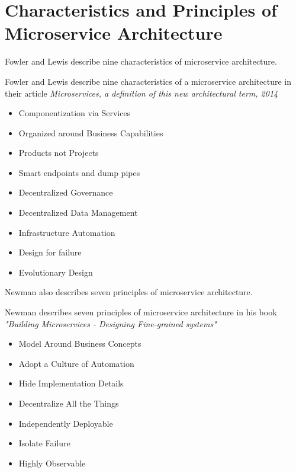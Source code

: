 \chapter{Characteristics and Principles of Microservice Architecture}
\label{appendix:microservices}

Fowler and Lewis \cite{lewis2014microservices} describe nine characteristics of microservice architecture. 

\begin{kasse} 
Fowler and Lewis describe nine characteristics of a microservice architecture in their article \textit{Microservices, a definition of this new architectural term, 2014} \cite{lewis2014microservices}
\vspace{-3mm}
\begin{itemize}
\setlength\itemsep{0.05em}
  \item Componentization via Services
  \item Organized around Business Capabilities
  \item Products not Projects
  \item Smart endpoints and dump pipes
  \item Decentralized Governance
  \item Decentralized Data Management
  \item Infrastructure Automation
  \item Design for failure
  \item Evolutionary Design
\end{itemize}
\end{kasse}

\noindent Newman \cite{newman2015building} also describes seven principles of microservice architecture.

\begin{kasse} 
Newman describes seven principles of microservice architecture in his book \textit{"Building Microservices - Designing Fine-grained systems"} \cite[p. 245-249]{newman2015building}  
\vspace{-3mm}
\begin{itemize}
\setlength\itemsep{0.05em}
  \item Model Around Business Concepts
  \item Adopt a Culture of Automation
  \item Hide Implementation Details
  \item Decentralize All the Things
  \item Independently Deployable
  \item Isolate Failure
  \item Highly Observable
\end{itemize}
\end{kasse}

